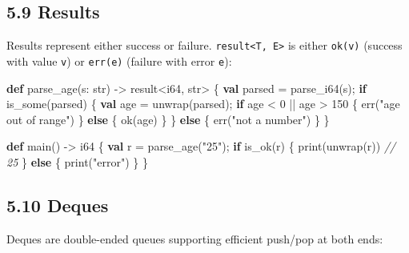 \documentclass[
  english,
]{book}
\newenvironment{Shaded}{\begin{snugshade}}{\end{snugshade}}
\newcommand{\CommentTok}[1]{\textcolor[rgb]{0.42,0.60,0.33}{\textit{#1}}}
\newcommand{\ControlFlowTok}[1]{\textcolor[rgb]{0.77,0.53,0.75}{\textbf{#1}}}
\newcommand{\DataTypeTok}[1]{\textcolor[rgb]{0.31,0.79,0.69}{#1}}
\newcommand{\DecValTok}[1]{\textcolor[rgb]{0.71,0.81,0.66}{#1}}
\newcommand{\FunctionTok}[1]{\textcolor[rgb]{0.86,0.86,0.67}{#1}}
\newcommand{\KeywordTok}[1]{\textcolor[rgb]{0.34,0.61,0.84}{\textbf{#1}}}
\newcommand{\NormalTok}[1]{\textcolor[rgb]{0.83,0.83,0.83}{#1}}
\newcommand{\OperatorTok}[1]{\textcolor[rgb]{0.83,0.83,0.83}{#1}}
\newcommand{\StringTok}[1]{\textcolor[rgb]{0.81,0.57,0.47}{#1}}
\begin{document}
\subsection{5.9 Results}\label{results}

Results represent either success or failure.
\texttt{result\textless{}T,\ E\textgreater{}} is either \texttt{ok(v)}
(success with value \texttt{v}) or \texttt{err(e)} (failure with error
\texttt{e}):

\begin{Shaded}
\begin{Highlighting}[]
\KeywordTok{def}\NormalTok{ parse\_age(s: }\DataTypeTok{str}\NormalTok{) }\OperatorTok{{-}\textgreater{}} \DataTypeTok{result}\OperatorTok{\textless{}}\DataTypeTok{i64}\NormalTok{, }\DataTypeTok{str}\OperatorTok{\textgreater{}}\NormalTok{ \{}
    \KeywordTok{val}\NormalTok{ parsed }\OperatorTok{=} \FunctionTok{parse\_i64}\NormalTok{(s);}
    \ControlFlowTok{if} \FunctionTok{is\_some}\NormalTok{(parsed) \{}
        \KeywordTok{val}\NormalTok{ age }\OperatorTok{=}\NormalTok{ unwrap(parsed);}
        \ControlFlowTok{if}\NormalTok{ age }\OperatorTok{\textless{}} \DecValTok{0} \OperatorTok{||}\NormalTok{ age }\OperatorTok{\textgreater{}} \DecValTok{150}\NormalTok{ \{}
            \FunctionTok{err}\NormalTok{(}\StringTok{"age out of range"}\NormalTok{)}
\NormalTok{        \} }\ControlFlowTok{else}\NormalTok{ \{}
            \FunctionTok{ok}\NormalTok{(age)}
\NormalTok{        \}}
\NormalTok{    \} }\ControlFlowTok{else}\NormalTok{ \{}
        \FunctionTok{err}\NormalTok{(}\StringTok{"not a number"}\NormalTok{)}
\NormalTok{    \}}
\NormalTok{\}}

\KeywordTok{def}\NormalTok{ main() }\OperatorTok{{-}\textgreater{}} \DataTypeTok{i64}\NormalTok{ \{}
    \KeywordTok{val}\NormalTok{ r }\OperatorTok{=}\NormalTok{ parse\_age(}\StringTok{"25"}\NormalTok{);}
    \ControlFlowTok{if} \FunctionTok{is\_ok}\NormalTok{(r) \{}
        \FunctionTok{print}\NormalTok{(unwrap(r))   }\CommentTok{// 25}
\NormalTok{    \} }\ControlFlowTok{else}\NormalTok{ \{}
        \FunctionTok{print}\NormalTok{(}\StringTok{"error"}\NormalTok{)}
\NormalTok{    \}}
\NormalTok{\}}
\end{Highlighting}
\end{Shaded}

\subsection{5.10 Deques}\label{deques}

Deques are double-ended queues supporting efficient push/pop at both
ends:
\end{document}
